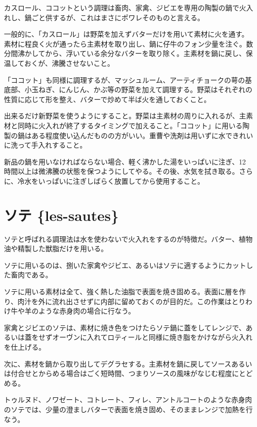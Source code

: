 カスロール、ココットという調理は畜肉、家禽、ジビエを専用の陶製の鍋で火入れし、鍋ごと供するが、これはまさにポワレそのものと言える。

一般的に、「カスロール」は野菜を加えずバターだけを用いて素材に火を通す。素材に程良く火が通ったら主素材を取り出し、鍋に仔牛のフォン少量を注ぐ。数分間沸かしてから、浮いている余分なバターを取り除く。主素材を鍋に戻し、保温しておくが、沸騰させないこと。

「ココット」も同様に調理するが、マッシュルーム、アーティチョークの萼の基底部、小玉ねぎ、にんじん、かぶ等の野菜を加えて調理する。野菜はそれぞれの性質に応じて形を整え、バターで炒めて半ば火を通しておくこと。

出来るだけ新野菜を使うようにすること。野菜は主素材の周りに入れるが、主素材と同時に火入れが終了するタイミングで加えること。「ココット」に用いる陶製の鍋はある程度使い込んだものの方がいい。重曹や洗剤は用いずに水できれいに洗って手入れすること。

新品の鍋を用いなければならない場合、軽く沸かした湯をいっぱいに注ぎ、12
時間以上は微沸騰の状態を保つようにしてやる。その後、水気を拭き取る。さらに、冷水をいっぱいに注ぎしばらく放置してから使用すること。

\hypertarget{ux30bdux30c6-les-sautes}{%
\section{ソテ \{les-sautes\}}\label{ux30bdux30c6-les-sautes}}

ソテと呼ばれる調理法は水を使わないで火入れをするのが特徴だ。バター、植物油や精製した獣脂だけを用いる。

ソテに用いるのは、捌いた家禽やジビエ、あるいはソテに適するようにカットした畜肉である。

ソテに用いる素材は全て、強く熱した油脂で表面を焼き固める。表面に層を作り、肉汁を外に流れ出させずに内部に留めておくのが目的だ。この作業はとりわけ牛や羊のような赤身肉の場合に行なう。

家禽とジビエのソテは、素材に焼き色をつけたらソテ鍋に蓋をしてレンジで、あるいは蓋をせずオーヴンに入れてロティールと同様に焼き脂をかけながら火入れを仕上げる。

次に、素材を鍋から取り出してデグラセする。主素材を鍋に戻してソースあるいは付合せとからめる場合はごく短時間、つまりソースの風味がなじむ程度にとどめる。

トゥルヌド、ノワゼート、コトレート、フィレ、アントルコートのような赤身肉のソテでは、少量の澄ましバターで表面を焼き固め、そのままレンジで加熱を行なう。

